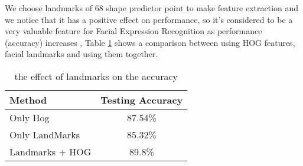 We choose landmarks of 68 shape predictor point to make feature extraction and we notice that it has a positive effect on performance, so it's considered to be a very valuable feature for Facial Expression Recognition as performance (accuracy) increases , Table \ref{tab:landmarks_HOG_comp} shows a comparison between using HOG features,  facial landmarks and  using them together.
\begin{table}[h!]
	\label{tab:landmarks_HOG_comp}
	\begin{center}
		\caption{the effect of landmarks on the accuracy}
		\begin{tabular}{l|c}
			\textbf{Method} & \textbf{Testing Accuracy}     \\
			\hline
			Only Hog & 87.54\% \\ 
			Only LandMarks & 85.32\%  \\
			Landmarks + HOG & 89.8\% \\
		\end{tabular}
	\end{center}
\end{table}


